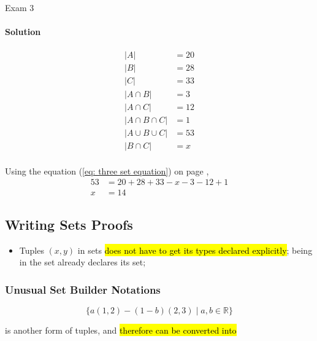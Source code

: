 \documentclass{note}
\newcommand{\intersect}{\cap}
\newcommand{\union}{\cup}
\begin{document}
\begin{note}{Exam 3}
        \paragraph{Solution}
        \begin{align*}
            \left| A \right| &= 20\\
            \left| B \right| &= 28\\
            \left| C \right| &= 33\\
            \left| A \intersect B \right| &= 3\\
            \left| A \intersect C\right| &= 12\\
            \left| A \intersect B \intersect C \right| &= 1\\
            \left| A \union B \union C \right| &= 53\\
            \left| B \intersect C \right| &= x\\
        \end{align*}

        Using the equation (\ref{eq: three set equation}) on page \pageref{eq: three set equation},
        \begin{align*}
            53 &= 20 + 28 + 33 - x - 3 - 12 + 1\\
            x &= 14
        \end{align*}

        \subsection{Writing Sets Proofs}

        \begin{itemize}
            \item Tuples $ (x,y) $ in sets \hl{does not have to get its types declared explicitly}; being in the set already
            declares its set;
        \end{itemize}

        \subsubsection{Unusual Set Builder Notations}

        \begin{displaymath}
            \{ a(1,2) - (1 - b)(2,3) \mid a, b \in \mathbb{R} \}
        \end{displaymath}

        is another form of tuples, and \hl{therefore can be converted into}


\end{note}
\end{document}
